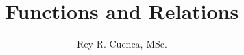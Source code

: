 \documentclass[17pt]{beamer}
\begin{document}
	\author{Rey R. Cuenca, MSc.}
	\title{Functions and Relations}
	\begin{frame}[plain]
		\maketitle
	\end{frame}
	
	\begin{frame}
	\end{frame}

	\begin{frame}
\end{frame}
	\begin{frame}
\end{frame}
	\begin{frame}
\end{frame}
\end{document}
